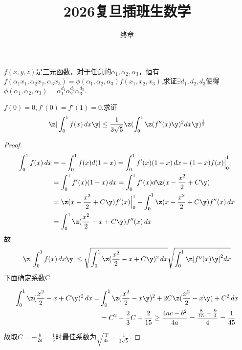 \documentclass[lang=cn,newtx,10pt,scheme=chinese]{elegantbook}
\title{2026复旦插班生数学} %
\subtitle{终章 }
\begin{document}
\maketitle
\frontmatter

\newpage

\begin{example}
$f(x,y,z)$是三元函数，对于任意的$\alpha_1,\alpha_2,\alpha_3$，恒有$f(\alpha_1x_1,\alpha_2x_2,\alpha_3x_3) = \phi(\alpha_1,\alpha_2,\alpha_3) f(x_1,x_2,x_3) $,求证$\exists d_1,d_2,d_3$使得$\phi(\alpha_1,\alpha_2,\alpha_3) = \alpha_{1}^{d_1}\alpha_{2}^{d_2}\alpha_{3}^{d_3}$.
\end{example}

\newpage

\begin{example}
$f(0)=0,f'(0)=f'(1)=0$,求证
\[ \z| \int_{0}^{1} f(x)\,dx \y| \le \frac{1}{3\sqrt{5}} 
\z( \int_{0}^{1} \z(f''(x)\y)^2 dx \y)^{\frac{1}{2}}   \]
\end{example}


\begin{proof}
\begin{align*}
\int_{0}^{1} f(x)\,dx &= -\int_{0}^{1} f(x) d(1-x) 
= \int_{0}^{1} f'(x)(1-x)\,dx - (1-x)f(x) \Big|_{0}^{1} \\
&= \int_{0}^{1} f'(x)(1-x)\,dx = \int_{0}^{1} f'(x) d\z( x -\frac{x^2}{2} +C\y)\\
&= \z( x -\frac{x^2}{2} +C\y) f'(x) \Big|_{0}^{1} - \int_{0}^{1} \z( x -\frac{x^2}{2} +C\y) f''(x)\,dx \\
&= \int_{0}^{1} \z(\frac{x^2}{2}-x+C\y) f''(x)\,dx 
\end{align*}
故
\[ \z| \int_{0}^{1} f(x)\,dx \y| \le \sqrt{\int_{0}^{1} \z(\frac{x^2}{2}-x+C\y)^2\,dx} \sqrt{ \int_{0}^{1} \z[f''(x)\y]^2 dx }   \]
下面确定系数C

\begin{align*}
\int_{0}^{1} \z(\frac{x^2}{2}-x+C\y)^2\,dx = &\int_{0}^{1}
  \z(\frac{x^2}{2}-x \y)^2 +2C\z(\frac{x^2}{2}-x \y) + C^2 \,dx \\
&=C^2 -\frac{2}{3}C +\frac{2}{15} \ge \frac{4ac-b^2}{4a} = \frac{\frac{8}{15}-\frac{9}{4}}{4} = \frac{1}{45}
\end{align*}

故取$C=-\frac{b}{2a}=\frac{1}{3} $时最佳系数为$\sqrt{\frac{1}{45}} = \frac{1}{3\sqrt{5}}$.
\end{proof}


\newpage

\end{document}
